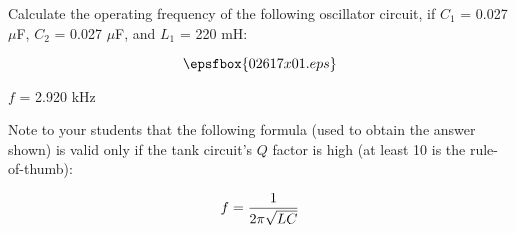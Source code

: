 

Calculate the operating frequency of the following oscillator circuit, if $C_1$ = 0.027 $\mu$F, $C_2$ = 0.027 $\mu$F, and $L_1$ = 220 mH:

$$\epsfbox{02617x01.eps}$$







$f$ = 2.920 kHz







Note to your students that the following formula (used to obtain the answer shown) is valid only if the tank circuit's $Q$ factor is high (at least 10 is the rule-of-thumb):

$$f = {1 \over {2 \pi \sqrt{LC}}}$$





